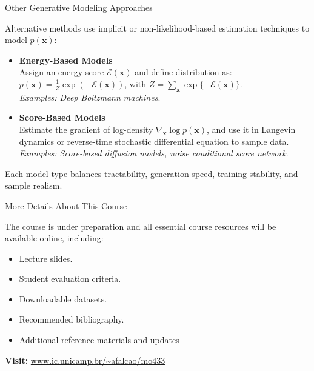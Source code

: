 \documentclass{beamer}
\begin{document}
\begin{frame}{Other Generative Modeling Approaches}

Alternative methods use implicit or non-likelihood-based estimation techniques to model \( p(\mathbf{x}) \):

\vspace{0.3cm}
\begin{itemize}
  \item \textbf{Energy-Based Models} \\
  Assign an energy score \( \mathcal{E}(\mathbf{x}) \) and define distribution as:  
  \( p(\mathbf{x}) = \frac{1}{Z} \exp(-\mathcal{E}(\mathbf{x})) \), with \( Z = \sum_{\mathbf{x}} \exp\{-\mathcal{E}(\mathbf{x})\}\). \\
  \textit{Examples: Deep Boltzmann machines}.

  \vspace{0.3cm}
  \item \textbf{Score-Based Models} \\
  Estimate the gradient of log-density \( \nabla_{\mathbf{x}} \log p(\mathbf{x}) \), and use it in Langevin dynamics or reverse-time stochastic differential equation to sample data. \\
  \textit{Examples: Score-based diffusion models, noise conditional score network}.
\end{itemize}

\vspace{0.3cm}
Each model type balances tractability, generation speed, training stability, and sample realism.

\end{frame}

\begin{frame}{More Details About This Course}

\vspace{0.3cm}
The course is under preparation and all essential course resources will be available online, including:

\vspace{0.5cm}
\begin{itemize}
  \item Lecture slides.
  \vspace{0.4cm}
  \item Student evaluation criteria.
  \vspace{0.4cm}
  \item Downloadable datasets.
  \vspace{0.4cm}
  \item Recommended bibliography.
  \vspace{0.4cm}
  \item Additional reference materials and updates
\end{itemize}

\vspace{0.8cm}
\begin{center}
\textbf{Visit:} \url{www.ic.unicamp.br/~afalcao/mo433}
\end{center}
\end{frame}
\end{document}
